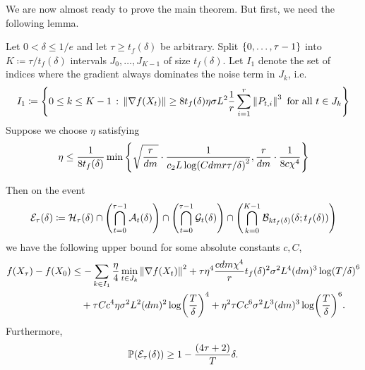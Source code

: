 We are now almost ready to prove the main theorem. But first, we need the following lemma.

\begin{lemma}\label{lem:function-change-for-large-tau}
    Let $0 < \delta \leq 1/e$ and let $\tau \geq t_f(\delta)$ be arbitrary. Split $\set{0, \ldots, \tau-1}$ into $K \coloneqq \tau/t_f(\delta)$ intervals $J_0, \ldots, J_{K-1}$ of size $t_f(\delta)$. Let $I_1$ denote the set of indices where the gradient always dominates the noise term in $J_k$, i.e.
    \begin{align*}
        I_1 \coloneqq \set{0 \leq k \leq K-1 \,:\, \mg{\grad f(X_t)} \geq 8t_f(\delta) \eta \sigma L^2 \frac 1r \sum_{i=1}^r \mg{P_{t,i}}^3  \text{ for all $t \in J_k$}}
    \end{align*}
    Suppose we choose $\eta$ satisfying
    \begin{align*}
        \eta \leq \frac{1}{8t_f(\delta)} \min\set{\sqrt{\frac{r}{dm}} \cdot \frac{1}{c_2 L \log(Cdmr\tau/\delta)^2}, \frac{r}{dm} \cdot \frac{1}{8c\chi^4}}
    \end{align*}

    Then on the event
    \begin{align*}
        \mathcal E_\tau(\delta) \coloneqq \mathcal H_\tau(\delta) \cap \qty(\bigcap_{t=0}^{\tau-1} \mathcal A_t(\delta)) \cap \qty(\bigcap_{t=0}^{\tau-1} \mathcal G_t(\delta) ) \cap \qty(\bigcap_{k=0}^{K-1} \mathcal B_{kt_f(\delta)}(\delta ; t_f(\delta)))
    \end{align*}
    we have the following upper bound for some absolute constants $c,C$,
    \begin{align*}
        f(X_\tau) - f(X_0) &\leq  -\sum_{k \in I_1} \frac{\eta}{4} \min_{t \in J_k} \mg{\grad f(X_t)}^2 + \tau \eta^4 \frac{cdm\chi^4}{r} t_f(\delta)^2 \sigma^2 L^4 (dm)^3 \log(T/\delta)^6\\
        &\quad + \tau C c^4 \eta \sigma^2 L^2(dm)^2 \log(\frac T\delta)^4 + \eta^2 \tau C c^6  \sigma^2 L^3 (dm)^3 \log(\frac T \delta)^6.
    \end{align*}
    Furthermore, 
    \begin{align*}
        \P(\mathcal E_\tau(\delta)) \geq 1 - \frac{(4\tau+2)}{T}\delta.
    \end{align*}
\end{lemma}

